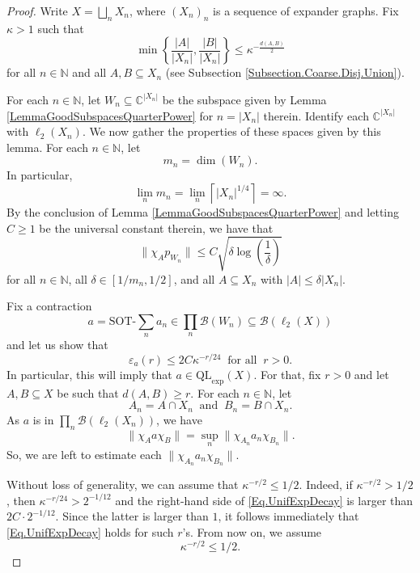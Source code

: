 \documentclass[11pt]{amsart}
\newcommand{\N}{\mathbb{N}}
\newcommand{\C}{\mathbb{C}}
\newcommand{\cB}{\mathcal{B}}
\newcommand{\eps}{\varepsilon}
\newcommand{\SOTh}{\mathrm{SOT}\text{-}}
\numberwithin{equation}{section}
\theoremstyle{definition}
\theoremstyle{remark}
\begin{document}
\begin{proof}
  Write  $X=\bigsqcup_nX_n$, where $(X_n)_n$ is a sequence of expander graphs.  Fix $\kappa>1$ such that
   \begin{equation}\label{Eq.asympt.exp.eq}\min\left\{\frac{|A|}{|X_{n}|},\frac{|B|}{|X_{n}|}\right\}\leq \kappa^{ -\frac{d(A,B)}{2}}\end{equation}
  for all $n\in\N$ and all $A,B\subseteq X_n$ (see Subsection \ref{Subsection.Coarse.Disj.Union}).

  For each $n\in\N$, let $W_n\subseteq \C^{|X_n|}$ be the   subspace given by Lemma \ref{LemmaGoodSubspacesQuarterPower} for $n=|X_n|$ therein. Identify each $\C^{|X_n|}$ with $\ell_2(X_n)$.  We now gather the properties of these spaces given by this lemma. For each $n\in\N$, let
  \[m_n=\dim(W_n).\]
In particular,
\[\lim_nm_n=\lim_n\left\lceil |X_n|^{1/4}\right\rceil=\infty.\]
By  the conclusion of Lemma \ref{LemmaGoodSubspacesQuarterPower} and letting $C\geq 1$ be the universal constant therein, we have that
\begin{equation}\label{Eq.GoodSubspace.Complex}
        \|\chi_Ap_{W_n}\|\leq C\sqrt{\delta\log\left(\frac{1}{\delta}\right)}
    \end{equation}
  for all $n\in\N$, all $\delta\in[1/m_n,1/2]$, and all $A\subseteq X_n$ with $|A|\leq \delta |X_n|$.

  Fix a contraction
  \[a=\SOTh\sum_na_n\in \prod_n\cB(W_n)\subseteq \cB(\ell_2(X))\]
  and let us show that
   \begin{equation}\label{Eq.UnifExpDecay}
   \eps_a(r)\leq 2C\kappa^{-r/24}\ \text{ for all }\ r>0.
   \end{equation}
  In particular, this will imply that $a\in\mathrm{QL}_{\exp}(X)$. For that, fix $r>0$ and let $A,B\subseteq X$ be such that $d(A,B)\geq r$. For each $n\in\N$, let
 \[A_n=A\cap X_{n}\ \text{ and }\ B_n=B\cap X_{n}.\]
  As $a$ is in $\prod_n\cB(\ell_2(X_n))$,  we have
 \[\|\chi_Aa\chi_B\|=\sup_n\|\chi_{A_n}a_n\chi_{B_n}\| .\]
So, we are left to estimate each
$\|\chi_{A_n}a_n\chi_{B_n}\|$.

Without loss of generality, we can assume   that  $\kappa^{-r/2}\leq 1/2$. Indeed,   if $\kappa^{-r/2}>1/2$, then $\kappa^{-r/24}>2^{-1/12}$ and  the right-hand side of \eqref{Eq.UnifExpDecay} is larger than $2C\cdot 2^{-1/12}$.  Since the latter is larger than $1$, it follows immediately that \eqref{Eq.UnifExpDecay}  holds for such $r$'s. From now on, we assume
\begin{equation}\label{Eq.21.aug.26.1}
\kappa^{-r/2}\leq 1/2.
\end{equation}



\end{proof}
\end{document}
